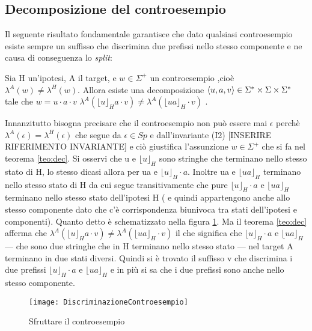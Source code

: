 \subsection[Decomposizione controesempio]{Decomposizione del controesempio}
Il seguente risultato fondamentale \cite{Schapire93} garantisce che dato qualsiasi controesempio esiste sempre un suffisso che discrimina due prefissi nello stesso componente e ne causa di conseguenza lo \textit{split}:
\begin{teorema}\label{teo:dec} Sia H un'ipotesi, A il target, e $w \in \Sigma^{+}$ un controesempio ,cioè $\lambda^{A}(w) \neq \lambda^{H}(w)$. Allora esiste una decomposizione $\Braket{u,a,v} \in \Sigma^{*} \times \Sigma \times \Sigma^{*}$ tale che $w = u\!\cdot\! a\!\cdot\! v$  $\lambda^{A}(\lfloor u \rfloor_{H} a \cdot v) \neq \lambda^{A}(\lfloor ua \rfloor_{H} \cdot v)$ .
\end{teorema}  
Innanzitutto bisogna precisare che il controesempio non può essere mai $\epsilon$ perchè $\lambda^A(\epsilon) = \lambda^H(\epsilon)$ che segue da $\epsilon \in Sp$ e dall'invariante (I2) [INSERIRE RIFERIMENTO INVARIANTE] e ciò giustifica l'assunzione $w \in \Sigma^{+}$ che si fa nel teorema \ref{teo:dec}. Si osservi che u e $\lfloor u \rfloor_{H}$ sono stringhe che terminano nello stesso stato di \ac{H}, lo stesso dicasi allora per ua e $\lfloor u \rfloor_{H}\cdot a$. Inoltre ua e $\lfloor ua \rfloor_{H}$ terminano nello stesso stato di \ac{H} da cui segue transitivamente che pure $\lfloor u \rfloor_{H}\cdot a$ e $\lfloor ua \rfloor_{H}$  terminano nello stesso stato dell'ipotesi \ac{H} ( e quindi appartengono anche allo stesso componente dato che c'è corrispondenza biunivoca tra stati dell'ipotesi e componenti). Quanto detto è schematizzato nella figura \ref{fig:con}. Ma il teorema \ref{teo:dec} afferma che $\lambda^{A}(\lfloor u \rfloor_{H} a \cdot v) \neq \lambda^{A}(\lfloor ua \rfloor_{H} \cdot v)$ il che significa che $\lfloor u \rfloor_{H}\cdot a$ e $\lfloor ua \rfloor_{H}$ --- che sono due stringhe che in \ac{H} terminano nello stesso stato --- nel target A terminano in due stati diversi. Quindi si è trovato il suffisso v che discrimina i due prefissi $\lfloor u \rfloor_{H} \cdot a$ e $\lfloor ua \rfloor_{H}$ e in più si sa che i due prefissi sono anche nello stesso componente.
\begin{figure}[htp]
	\centering
	\texttt{[image: DiscriminazioneControesempio]}
	\caption[Sfruttare il controesempio]{Sfruttare il controesempio}
   \label{fig:con}
\end{figure}
